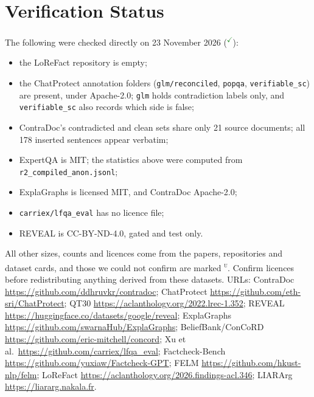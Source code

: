 \documentclass[10pt]{article}
\newcommand{\ok}{\textsuperscript{\textcolor{ForestGreen}{\ensuremath{\checkmark}}}}
\newcommand{\unv}{\textsuperscript{\textsc{u}}}
\begin{document}
\section{Verification Status}

The following were checked directly on 23 November 2026 (\ok):
\begin{itemize}
\item the LoReFact repository is empty;
\item the ChatProtect annotation folders (\texttt{glm/reconciled}, \texttt{popqa},
  \texttt{verifiable\_sc}) are present, under Apache-2.0; \texttt{glm} holds contradiction labels
  only, and \texttt{verifiable\_sc} also records which side is false;
\item ContraDoc's contradicted and clean sets share only 21 source documents; all 178 inserted
  sentences appear verbatim;
\item ExpertQA is MIT; the statistics above were computed from \texttt{r2\_compiled\_anon.jsonl};
\item ExplaGraphs is licensed MIT, and ContraDoc Apache-2.0;
\item \texttt{carriex/lfqa\_eval} has no licence file;
\item REVEAL is CC-BY-ND-4.0, gated and test only.
\end{itemize}
All other sizes, counts and licences come from the papers, repositories and dataset cards, and
those we could not confirm are marked \unv. Confirm licences before redistributing anything derived
from these datasets. URLs: ContraDoc \url{https://github.com/ddhruvkr/contradoc}; ChatProtect
\url{https://github.com/eth-sri/ChatProtect}; QT30 \url{https://aclanthology.org/2022.lrec-1.352};
REVEAL \url{https://huggingface.co/datasets/google/reveal}; ExplaGraphs
\url{https://github.com/swarnaHub/ExplaGraphs}; BeliefBank/ConCoRD
\url{https://github.com/eric-mitchell/concord}; Xu et al.\ \url{https://github.com/carriex/lfqa_eval};
Factcheck-Bench \url{https://github.com/yuxiaw/Factcheck-GPT}; FELM
\url{https://github.com/hkust-nlp/felm}; LoReFact \url{https://aclanthology.org/2026.findings-acl.346};
LIARArg \url{https://liararg.nakala.fr}.



\end{document}
